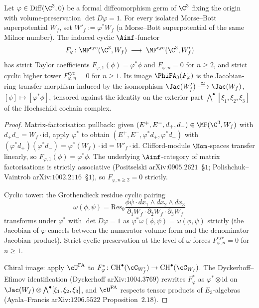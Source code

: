 \begin{proposition}
\label{prop:explicit-diffeomorphism-jacobian-transfer-d3}
Let $\varphi \in \mathrm{Diff}(\C^3, 0)$ be a formal diffeomorphism
germ of $\C^3$ fixing the origin with volume-preservation
$\det D\varphi = 1$. For every isolated Morse--Bott superpotential
$W_f$, set $W'_f := \varphi^* W_f$ (a Morse--Bott superpotential of
the same Milnor number). The induced cyclic $\Ainf$-functor
\[
 F_\varphi \colon
 \MF^{\mathrm{cyc}}(\C^3, W_f) \;\longrightarrow\; \MF^{\mathrm{cyc}}(\C^3, W'_f)
\]
has strict Taylor coefficients $F_{\varphi, 1}(\phi) = \varphi^* \phi$
and $F_{\varphi, n} = 0$ for $n \geq 2$, and strict cyclic higher tower
$F_{\varphi, n}^{\mathrm{cyc}} = 0$ for $n \geq 1$. Its image
$\PhiFA_3(F_\varphi)$ is the Jacobian-ring transfer morphism induced
by the isomorphism $\Jac(W'_f) \xrightarrow{\;\simeq\;} \Jac(W_f)$,
$[\phi] \mapsto [\varphi^* \phi]$, tensored against the identity on
the exterior part $\bigwedge^\bullet[\xi_1, \xi_2, \xi_3]$ of the
Hochschild cochain complex.
\end{proposition}

\begin{proof}
Matrix-factorisation pullback: given
$(E^+, E^-, d_+, d_-) \in \MF(\C^3, W_f)$ with $d_+ d_- = W_f \cdot
\mathrm{id}$, apply $\varphi^*$ to obtain $(E^+, E^-, \varphi^* d_+,
\varphi^* d_-)$ with $(\varphi^* d_+)(\varphi^* d_-) = \varphi^*(W_f)
\cdot \mathrm{id} = W'_f \cdot \mathrm{id}$. Clifford-module
$\Hom$-spaces transfer linearly, so $F_{\varphi, 1}(\phi) = \varphi^*
\phi$. The underlying $\Ainf$-category of matrix factorisations is
strictly associative (Positselski arXiv:$0905.2621$~\S$1$; Polishchuk--
Vaintrob arXiv:$1002.2116$~\S$1$), so $F_{\varphi, n \geq 2} = 0$
strictly.

Cyclic tower: the Grothendieck residue cyclic pairing
\[
 \omega(\phi, \psi) = \mathrm{Res}_0 \frac{\phi \psi \cdot
 dx_1 \wedge dx_2 \wedge dx_3}{\partial_1 W_f \cdot \partial_2 W_f
 \cdot \partial_3 W_f}
\]
transforms under $\varphi^*$ with $\det D\varphi = 1$ as
$\varphi^*\omega(\phi, \psi) = \omega(\phi, \psi)$ strictly (the
Jacobian of $\varphi$ cancels between the numerator volume form and
the denominator Jacobian product). Strict cyclic preservation at the
level of $\omega$ forces $F_{\varphi, n}^{\mathrm{cyc}} = 0$ for
$n \geq 1$.

Chiral image: apply $\cU^{\mathrm{FA}}$ to $F_\varphi^* \colon
\mathrm{CH}^\bullet(\cC_{W'_f}) \to \mathrm{CH}^\bullet(\cC_{W_f})$.
The Dyckerhoff--Efimov identification (Dyckerhoff arXiv:$1004.3769$)
rewrites $F_\varphi^*$ as $\varphi^* \otimes \mathrm{id}$ on
$\Jac(W_f) \otimes \bigwedge^\bullet[\xi_1, \xi_2, \xi_3]$, and
$\cU^{\mathrm{FA}}$ respects tensor products of $E_3$-algebras
(Ayala--Francis arXiv:$1206.5522$ Proposition~$2.18$).
\end{proof}

